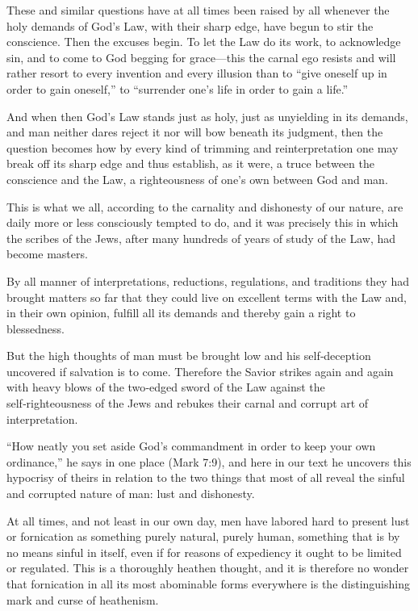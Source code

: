 These and similar questions have at all times been raised by all whenever the holy demands of God’s Law, with their sharp edge, have begun to stir the conscience. Then the excuses begin. To let the Law do its work, to acknowledge sin, and to come to God begging for grace—this the carnal ego resists and will rather resort to every invention and every illusion than to “give oneself up in order to gain oneself,” to “surrender one’s life in order to gain a life.”

And when then God’s Law stands just as holy, just as unyielding in its demands, and man neither dares reject it nor will bow beneath its judgment, then the question becomes how by every kind of trimming and reinterpretation one may break off its sharp edge and thus establish, as it were, a truce between the conscience and the Law, a righteousness of one’s own between God and man.

This is what we all, according to the carnality and dishonesty of our nature, are daily more or less consciously tempted to do, and it was precisely this in which the scribes of the Jews, after many hundreds of years of study of the Law, had become masters.

By all manner of interpretations, reductions, regulations, and traditions they had brought matters so far that they could live on excellent terms with the Law and, in their own opinion, fulfill all its demands and thereby gain a right to blessedness.

But the high thoughts of man must be brought low and his self‑deception uncovered if salvation is to come. Therefore the Savior strikes again and again with heavy blows of the two‑edged sword of the Law against the self‑righteousness of the Jews and rebukes their carnal and corrupt art of interpretation.

“How neatly you set aside God’s commandment in order to keep your own ordinance,” he says in one place (Mark 7:9), and here in our text he uncovers this hypocrisy of theirs in relation to the two things that most of all reveal the sinful and corrupted nature of man: lust and dishonesty.

At all times, and not least in our own day, men have labored hard to present lust or fornication as something purely natural, purely human, something that is by no means sinful in itself, even if for reasons of expediency it ought to be limited or regulated. This is a thoroughly heathen thought, and it is therefore no wonder that fornication in all its most abominable forms everywhere is the distinguishing mark and curse of heathenism.

